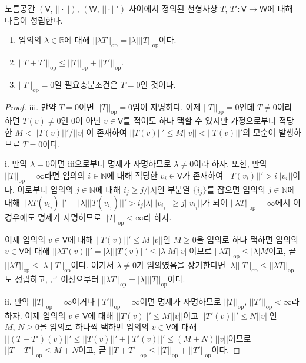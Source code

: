 \begin{proposition}\label{prop:opNormProp}
    노름공간 $(\mathsf{V},\,||\cdot||),\,(\mathsf{W},\,||\cdot||')$ 사이에서 정의된 선형사상 $T,\,T':\mathsf{V}\to\mathsf{W}$에 대해 다음이 성립한다.
    \begin{enumerate}
        \item 임의의 $\lambda\in\mathbb{R}$에 대해 $||\lambda T||_\mathrm{op}=|\lambda|||T||_\mathrm{op}$이다.
        \item $||T+T'||_\mathrm{op}\leq||T||_\mathrm{op}+||T'||_\mathrm{op}$.
        \item $||T||_\mathrm{op}=0$일 필요충분조건은 $T=0$인 것이다.
    \end{enumerate}
\end{proposition}

\begin{proof}
    iii. 만약 $T=0$이면 $||T||_\mathrm{op}=0$임이 자명하다. 이제 $||T||_\mathrm{op}=0$인데 $T\ne0$이라 하면 $T(v)\ne0$인 $0$이 아닌 $v\in\mathsf{V}$를 적어도 하나 택할 수 있지만 가정으로부터 적당한 $M<||T(v)||'/||v||$이 존재하여 $||T(v)||'\leq M||v||<||T(v)||'$의 모순이 발생하므로 $T=0$이다.

    i. 만약 $\lambda=0$이면 iii으로부터 명제가 자명하므로 $\lambda\ne0$이라 하자. 또한, 만약 $||T||_\mathrm{op}=\infty$라면 임의의 $i\in\mathbb{N}$에 대해 적당한 $v_i\in\mathsf{V}$가 존재하여 $||T(v_i)||'>i||v_i||$이다. 이로부터 임의의 $j\in\mathbb{N}$에 대해 $i_j\geq j/|\lambda|$인 부분열 $\{i_j\}$를 잡으면 임의의 $j\in\mathbb{N}$에 대해 $||\lambda T(v_{i_j})||'=|\lambda|||T(v_{i_j})||'>i_j|\lambda|||v_{i_j}||\geq j||v_{i_j}||$가 되어 $||\lambda T||_\mathrm{op}=\infty$에서 이 경우에도 명제가 자명하므로 $||T||_\mathrm{op}<\infty$라 하자.

    이제 임의의 $v\in\mathsf{V}$에 대해 $||T(v)||'\leq M||v||$인 $M\geq0$을 임의로 하나 택하면 임의의 $v\in\mathsf{V}$에 대해 $||\lambda T(v)||'=|\lambda|||T(v)||'\leq|\lambda|M||v||$이므로 $||\lambda T||_\mathrm{op}\leq|\lambda|M$이고, 곧 $||\lambda T||_\mathrm{op}\leq|\lambda|||T||_\mathrm{op}$이다. 여기서 $\lambda\ne0$가 임의였음을 상기한다면 $|\lambda|||T||_\mathrm{op}\leq||\lambda T||_\mathrm{op}$도 성립하고, 곧 이상으부터 $||\lambda T||_\mathrm{op}=|\lambda|||T||_\mathrm{op}$이다.

    ii. 만약 $||T||_\mathrm{op}=\infty$이거나 $||T'||_\mathrm{op}=\infty$이면 명제가 자명하므로 $||T||_\mathrm{op},\,||T'||_\mathrm{op}<\infty$라 하자. 이제 임의의 $v\in\mathsf{V}$에 대해 $||T(v)||'\leq M||v||$이고 $||T'(v)||'\leq N||v||$인 $M,\,N\geq0$을 임의로 하나씩 택하면 임의의 $v\in\mathsf{V}$에 대해 $||(T+T')(v)||'\leq||T(v)||'+||T'(v)||'\leq(M+N)||v||$이므로 $||T+T'||_\mathrm{op}\leq M+N$이고, 곧 $||T+T'||_\mathrm{op}\leq||T||_\mathrm{op}+||T'||_\mathrm{op}$이다.
\end{proof}

